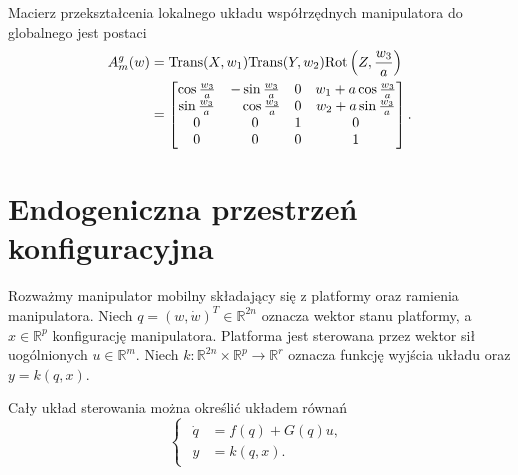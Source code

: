 Macierz przekształcenia lokalnego układu współrzędnych manipulatora do globalnego jest postaci
\begin{equation}
\begin{aligned}
A_m^g(w)&=\mathrm{Trans}(X, w_1)\mathrm{Trans}(Y, w_2)\mathrm{Rot}\left(Z, \frac{w_3}{a}\right)\\
&= \begin{bmatrix}
\cos \frac{w_3}{a} & -\sin \frac{w_3}{a} & 0 & w_1+a\cos \frac{w_3}{a}\\
\sin \frac{w_3}{a} & \phantom{-}\cos \frac{w_3}{a} & 0 & w_2+a\sin \frac{w_3}{a}\\
0 & 0 & 1 & 0\\
0 & 0 & 0 & 1
\end{bmatrix}.
\end{aligned}
\end{equation}

\section{Endogeniczna przestrzeń konfiguracyjna}
Rozważmy manipulator mobilny składający się z platformy oraz ramienia manipulatora. Niech $q = (w, \dot w)^T \in \mathbb{R}^{2n}$ oznacza wektor stanu platformy, a $x \in \mathbb{R}^p$ konfigurację manipulatora. Platforma jest sterowana przez wektor sił uogólnionych $u \in \mathbb{R}^m$. Niech $k: \mathbb{R}^{2n} \times \mathbb{R}^p \rightarrow \mathbb{R}^r$ oznacza funkcję wyjścia układu oraz $y=k(q,x)$.

Cały układ sterowania można określić układem równań
\begin{equation}
\begin{cases}
\begin{aligned}
\dot q &= f(q) + G(q)u,\\
y &= k(q, x).
\end{aligned}
\end{cases}
\end{equation}

